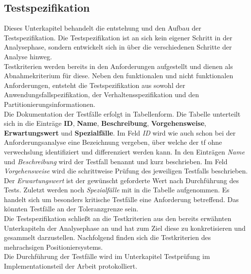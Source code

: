 \documentclass[../../../Bachelorarbeit.tex]{subfiles}
\begin{document}
\subsection{Testspezifikation} \label{testspez}
Dieses Unterkapitel behandelt die entstehung und den Aufbau der Testspezifikation. Die Testspezifikation ist an sich kein eigener Schritt in der Analysephase, sondern entwickelt sich in über die verschiedenen Schritte der Analyse hinweg.\\
Testkriterien werden bereits in den Anforderungen aufgestellt und dienen als Abnahmekriterium für diese. Neben den funktionalen und nicht funktionalen Anforderungen, entsteht die Testspezifikation aus sowohl der Anwendungsfallspezifikation, der Verhaltensspezifikation und den Partitionierungsinformationen.\\
Die Dokumentation der Testfälle erfolgt in Tabellenform. Die Tabelle unterteilt sich in die Einträge \textbf{ID}, \textbf{Name}, \textbf{Beschreibung}, \textbf{Vorgehensweise}, \textbf{Erwartungswert} und \textbf{Spezialfälle}. Im Feld \textit{ID} wird wie auch schon bei der Anforderungsanalyse eine Bezeichnung vergeben, über welche der \ac{tf} ohne verwechslung identifiziert und differenziert werden kann. In den Einträgen \textit{Name} und \textit{Beschreibung} wird der Testfall benannt und kurz beschrieben. Im Feld \textit{Vorgehensweise} wird die schrittweise Prüfung des jeweiligen Testfalls beschrieben. Der \textit{Erwartungswert} ist der gewünscht \bzw geforderte Wert nach Durchführung des Tests. Zuletzt werden noch \textit{Spezialfälle} mit in die Tabelle aufgenommen. Es handelt sich um besonders kritische Testfälle eine Anforderung betreffend. Das könnten \zB Testfälle an der Toleranzgrenze sein.\\
Die Testspezifikation schließt an die Testkriterien aus den bereits erwähnten Unterkapiteln der Analysephase an und hat zum Ziel diese zu konkretisieren und gesammelt darzustellen. Nachfolgend finden sich die Testkriterien des mehrachsigen Positioniersystems.\\ %
Die Durchführung der Testfälle wird im Unterkapitel Testprüfung im Implementationsteil der Arbeit protokolliert. %
\end{document}
